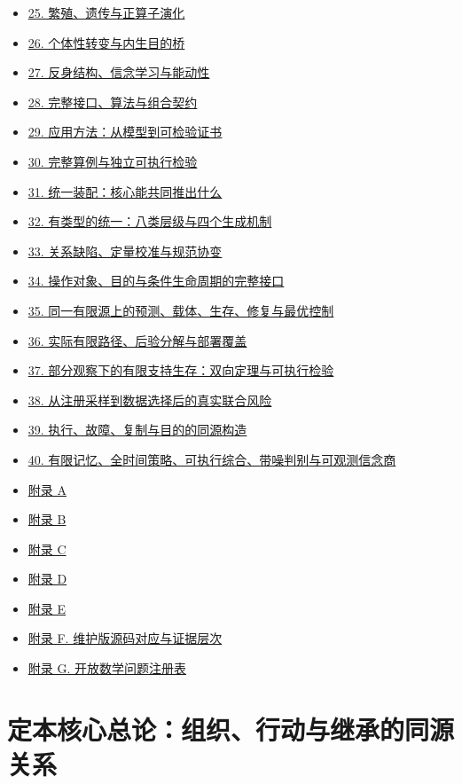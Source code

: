 \documentclass[
  11pt,
  oneside]{book}
\begin{document}
\begin{itemize}
\item
  \hyperref[ch-25]{25. 繁殖、遗传与正算子演化}
\item
  \hyperref[ch-26]{26. 个体性转变与内生目的桥}
\item
  \hyperref[ch-27]{27. 反身结构、信念学习与能动性}
\item
  \hyperref[ch-28]{28. 完整接口、算法与组合契约}
\item
  \hyperref[ch-29]{29. 应用方法：从模型到可检验证书}
\item
  \hyperref[ch-30]{30. 完整算例与独立可执行检验}
\item
  \hyperref[ch-31]{31. 统一装配：核心能共同推出什么}
\item
  \hyperref[ch-32]{32. 有类型的统一：八类层级与四个生成机制}
\item
  \hyperref[ch-33]{33. 关系缺陷、定量校准与规范协变}
\item
  \hyperref[ch-34]{34. 操作对象、目的与条件生命周期的完整接口}
\item
  \hyperref[ch-35]{35. 同一有限源上的预测、载体、生存、修复与最优控制}
\item
  \hyperref[ch-36]{36. 实际有限路径、后验分解与部署覆盖}
\item
  \hyperref[ch-37]{37. 部分观察下的有限支持生存：双向定理与可执行检验}
\item
  \hyperref[ch-38]{38. 从注册采样到数据选择后的真实联合风险}
\item
  \hyperref[ch-39]{39. 执行、故障、复制与目的的同源构造}
\item
  \hyperref[ch-40]{40. 有限记忆、全时间策略、可执行综合、带噪判别与可观测信念商}
\item
  \hyperref[appendix-a]{附录 A}
\item
  \hyperref[appendix-b]{附录 B}
\item
  \hyperref[appendix-c]{附录 C}
\item
  \hyperref[appendix-d]{附录 D}
\item
  \hyperref[appendix-e]{附录 E}
\item
  \hyperref[appendix-f]{附录 F. 维护版源码对应与证据层次}
\item
  \hyperref[appendix-g]{附录 G. 开放数学问题注册表}
\end{itemize}

\chapter{定本核心总论：组织、行动与继承的同源关系}\label{core-theory}
\end{document}
